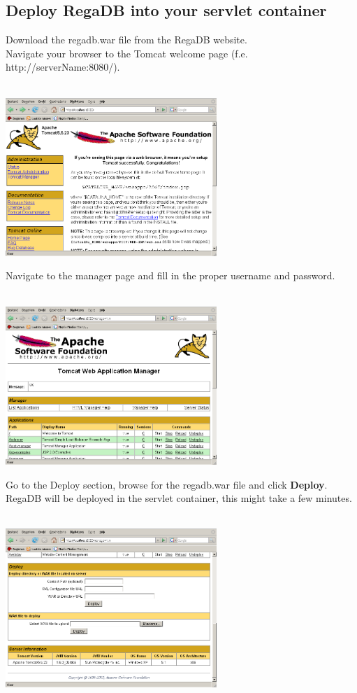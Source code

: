 \subsection{Deploy RegaDB into your servlet container}
Download the regadb.war file from the RegaDB website.
\\
Navigate your browser to the Tomcat welcome page (f.e. http://serverName:8080/).
\\
\vspace{0.5cm}~ \\ \centerline{\includegraphics[width=8cm] {pics/nsis/tomcat_page.png}}
Navigate to the manager page and fill in the proper username and password.
\\
\vspace{0.5cm}~ \\ \centerline{\includegraphics[width=8cm] {pics/nsis/tomcat_page_manager_1.png}}
Go to the Deploy section, browse for the regadb.war file and click \textbf{Deploy}. RegaDB will be deployed in the servlet container, this might take a few minutes.
\\
\vspace{0.5cm}~ \\ \centerline{\includegraphics[width=8cm] {pics/nsis/tomcat_page_manager_2.png}}

